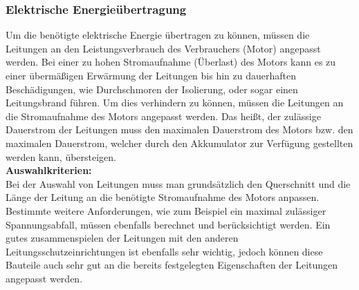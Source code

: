 \newpage



\subsubsection{Elektrische Energieübertragung}
Um die benötigte elektrische Energie übertragen zu können, müssen die Leitungen an den Leistungsverbrauch des Verbrauchers (Motor) angepasst werden. Bei einer zu hohen Stromaufnahme (Überlast) des Motors kann es zu einer übermäßigen Erwärmung der Leitungen bis hin zu dauerhaften Beschädigungen, wie Durchschmoren der Isolierung, oder sogar einen Leitungsbrand führen. Um dies verhindern zu können, müssen die Leitungen an die Stromaufnahme des Motors angepasst werden. Das heißt, der zulässige Dauerstrom der Leitungen muss den maximalen Dauerstrom des Motors bzw. den maximalen Dauerstrom, welcher durch den Akkumulator zur Verfügung gestellten werden kann, übersteigen.
\\[5mm]

\textbf{Auswahlkriterien:}
\\[2mm]
Bei der Auswahl von Leitungen muss man grundsätzlich den Querschnitt und die Länge der Leitung an die benötigte Stromaufnahme des Motors anpassen. Bestimmte weitere Anforderungen, wie zum Beispiel ein maximal zulässiger Spannungsabfall, müssen ebenfalls berechnet und berücksichtigt werden. Ein gutes zusammenspielen der Leitungen mit den anderen Leitungsschutzeinrichtungen ist ebenfalls sehr wichtig, jedoch können diese Bauteile auch sehr gut an die bereits festgelegten Eigenschaften der Leitungen angepasst werden.
\\[5mm]


